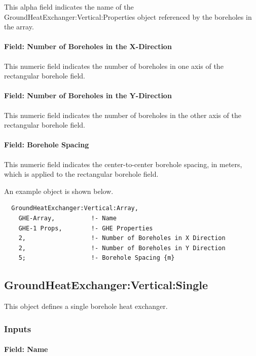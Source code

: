 This alpha field indicates the name of the GroundHeatExchanger:Vertical:Properties object referenced by the boreholes in the array.

\paragraph{Field: Number of Boreholes in the X-Direction}

This numeric field indicates the number of boreholes in one axis of the rectangular borehole field.

\paragraph{Field: Number of Boreholes in the Y-Direction}

This numeric field indicates the number of boreholes in the other axis of the rectangular borehole field.

\paragraph{Field: Borehole Spacing}

This numeric field indicates the center-to-center borehole spacing, in meters, which is applied to the rectangular borehole field.

An example object is shown below.

\begin{lstlisting}
  GroundHeatExchanger:Vertical:Array,
    GHE-Array,          !- Name
    GHE-1 Props,        !- GHE Properties
    2,                  !- Number of Boreholes in X Direction
    2,                  !- Number of Boreholes in Y Direction
    5;                  !- Borehole Spacing {m}
\end{lstlisting}

\subsection{GroundHeatExchanger:Vertical:Single}\label{groundheatexchangerverticalsingle}

This object defines a single borehole heat exchanger.

\subsubsection{Inputs}

\paragraph{Field: Name}

